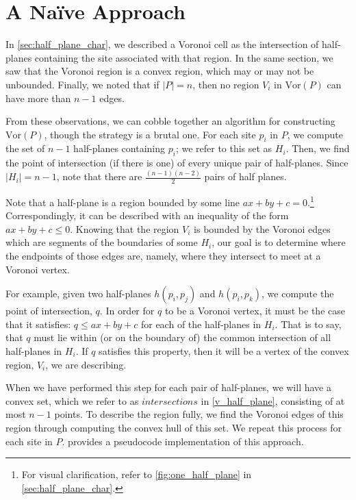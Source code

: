 \documentclass[12pt,twoside]{reedthesis}
\begin{document}
  \section{A Na{\"i}ve Approach} %
  \label{sec:a_naive_approach}
    In \cref{sec:half_plane_char}, we described a Voronoi cell as the intersection of half-planes containing the site associated with that region. In the same section, we saw that the Voronoi region is a convex region, which may or may not be unbounded. Finally, we noted that if $|P| = n$, then no region $V_{i}$ in $\mbox{Vor}(P)$ can have more than $n-1$ edges. \par


    From these observations, we can cobble together an algorithm for constructing $\mbox{Vor}(P)$, though the strategy is a brutal one. For each site $p_{i}$ in $P$, we compute the set of $n-1$ half-planes containing $p_{i}$; we refer to this set as $H_{i}$. Then, we find the point of intersection (if there is one) of every unique pair of half-planes. Since $|H_{i}| = n-1$, note that there are $\frac{(n-1)(n-2)}{2}$ pairs of half planes. \par

    Note that a half-plane is a region bounded by some line $ax + by + c = 0$.\footnote{For visual clarification, refer to \cref{fig:one_half_plane} in \cref{sec:half_plane_char}.} Correspondingly, it can be described with an inequality of the form $ax + by + c \leq 0$. Knowing that the region $V_{i}$ is bounded by the Voronoi edges which are segments of the boundaries of some $H_{i}$, our goal is to determine where the endpoints of those edges are, namely, where they intersect to meet at a Voronoi vertex. 

    For example, given two half-planes $h(p_{i}, p_{j})$ and $h(p_{i}, p_{k})$, we compute the point of intersection, $q$. In order for $q$ to be a Voronoi vertex, it must be the case that it satisfies: $q \leq ax + by + c$ for each of the half-planes in $H_{i}$. That is to say, that $q$ must lie within (or on the boundary of) the common intersection of all half-planes in $H_{i}$. If $q$ satisfies this property, then it will be a vertex of the convex region, $V_{i}$, we are describing. \par

    When we have performed this step for each pair of half-planes, we will have a convex set, which we refer to as $\textit{intersections}$ in \cref{v_half_plane}, consisting of at most $n-1$ points. To describe the region fully, we find the Voronoi edges of this region through computing the convex hull of this set. We repeat this process for each site in $P$.  provides a pseudocode implementation of this approach.\par
\end{document}
